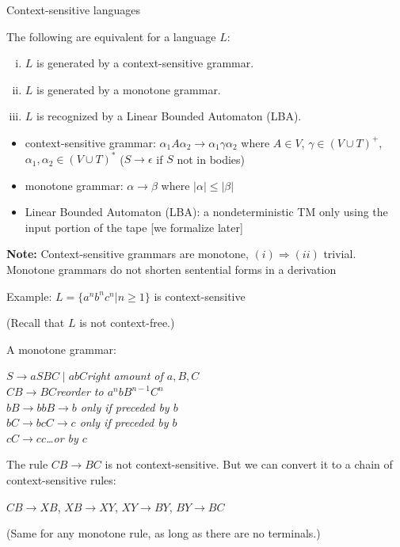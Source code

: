 \documentclass[handout]{beamer}
\begin{document}
\begin{frame}{Context-sensitive languages}

    \begin{theorem}
        The following are equivalent for a language $L$:
        \begin{enumerate}[(i)]
            \item $L$ is generated by a \alert{context-sensitive} grammar.
            \item $L$ is generated by a \alert{monotone} grammar.
            \item $L$ is recognized by a \alert{Linear Bounded Automaton} (\alert{LBA}).
        \end{enumerate}
    \end{theorem}

    \begin{itemize}
        \item \alert{context-sensitive} grammar: $\alpha_1 A \alpha_2\rightarrow \alpha_1\gamma\alpha_2$ where $A\in V$, $\gamma\in(V\cup T)^+$, $\alpha_1,\alpha_2\in (V\cup T)^*$ ($S\to\epsilon$ if $S$ not in bodies)
        \item \alert{monotone} grammar: $\alpha\to\beta$ where $|\alpha|\leq|\beta|$
        \item \alert{Linear Bounded Automaton} (\alert{LBA}): a nondeterministic TM only using the input portion of the tape [we formalize later]
    \end{itemize}

    \textbf{Note:} Context-sensitive grammars are monotone, $(i)\Rightarrow(ii)$ trivial.\\
    Monotone grammars do not shorten sentential forms in a derivation

\end{frame}


\begin{frame}{Example: $L=\{a^nb^nc^n| n\geq 1\} $ is context-sensitive}

    (Recall that $L$ is not context-free.)

    \medskip

    A \alert{monotone} grammar:

    \qquad$S\rightarrow aSBC\mid abC$\hfill{\it right amount of $a,B,C$}\\
    \qquad\alert{$CB\rightarrow BC$}\hfill{\it reorder to $a^nbB^{n-1}C^n$}\\
    \qquad$bB\rightarrow bb$\hfill{\it $B\to b$ only if preceded by $b$}\\
    \qquad$bC\rightarrow bc$\hfill{\it $C\to c$ only if preceded by $b$}\\
    \qquad$cC\rightarrow cc$\hfill{\it\dots or by $c$}

    \bigskip

    The rule $CB\rightarrow BC$ is not context-sensitive. But we can convert it to a chain of context-sensitive rules:

    \qquad$CB\rightarrow XB$, $XB\rightarrow XY$, $XY\rightarrow BY$, $BY\rightarrow BC$

    (Same for any monotone rule, as long as there are no terminals.)
    
\end{frame}
\end{document}
